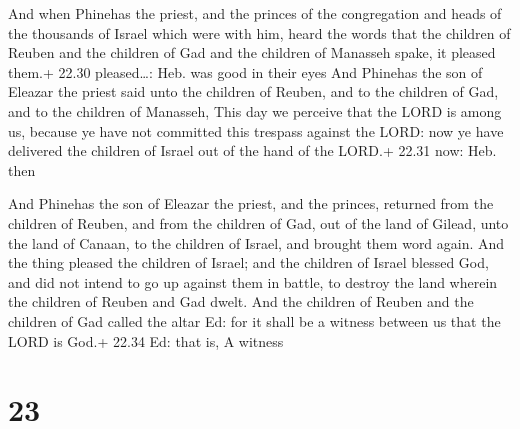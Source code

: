  And when Phinehas the priest, and the princes of the
congregation and heads of the thousands of Israel which were with him,
heard the words that the children of Reuben and the children of Gad and
the children of Manasseh spake, it pleased them.+ 22.30 pleased\ldots:
Heb. was good in their eyes  And Phinehas the son of
Eleazar the priest said unto the children of Reuben, and to the children
of Gad, and to the children of Manasseh, This day we perceive that the
LORD is among us, because ye have not committed this trespass against
the LORD: now ye have delivered the children of Israel out of the hand
of the LORD.+ 22.31 now: Heb. then

 And Phinehas the son of Eleazar the priest, and the
princes, returned from the children of Reuben, and from the children of
Gad, out of the land of Gilead, unto the land of Canaan, to the children
of Israel, and brought them word again.  And the thing
pleased the children of Israel; and the children of Israel blessed God,
and did not intend to go up against them in battle, to destroy the land
wherein the children of Reuben and Gad dwelt.  And the
children of Reuben and the children of Gad called the altar Ed: for it
shall be a witness between us that the LORD is God.+ 22.34 Ed: that is,
A witness

\hypertarget{section-22}{%
\section{23}\label{section-22}}

